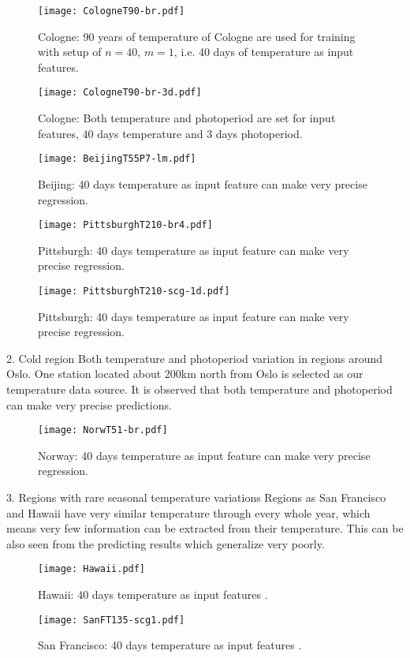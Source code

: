 \documentclass[paper=a4, fontsize=12pt]{scrartcl}	%
\numberwithin{equation}{section}					%
\numberwithin{figure}{section}					%
\numberwithin{table}{section}					%
\begin{document}
\begin{figure}[H]
\centering
\texttt{[image: CologneT90-br.pdf]}
\caption{Cologne: 90 years of temperature of Cologne are used for training with setup of $n=40$, $m=1$, i.e. 40 days of temperature as input features.}
\label{fig:cologneT}
\end{figure}
\begin{figure}[H]
\centering
\texttt{[image: CologneT90-br-3d.pdf]}
\caption{Cologne: Both temperature and photoperiod are set for input features, 40 days temperature and 3 days photoperiod. }
\label{fig:cologneTD}
\end{figure}

\begin{figure}[H]
\centering
\texttt{[image: BeijingT55P7-lm.pdf]}
\caption{Beijing: 40 days temperature as input feature can make very precise regression.}
\label{fig:beijing}
\end{figure}

\begin{figure}[H]
\centering
\texttt{[image: PittsburghT210-br4.pdf]}
\caption{Pittsburgh: 40 days temperature as input feature can make very precise regression.}
\label{fig:pittsT}
\end{figure}

\begin{figure}[H]
\centering
\texttt{[image: PittsburghT210-scg-1d.pdf]}
\caption{Pittsburgh: 40 days temperature as input feature can make very precise regression.}
\label{fig:pittsTD}
\end{figure}

2. Cold region
Both temperature and photoperiod variation in regions around Oslo. One station located about 200km north from Oslo is selected as our temperature data source. It is observed that both temperature and photoperiod can make very precise predictions. 
\begin{figure}[H]
\centering
\texttt{[image: NorwT51-br.pdf]}
\caption{Norway: 40 days temperature as input feature can make very precise regression.}
\label{fig:NorwayT}
\end{figure}

3. Regions with rare seasonal temperature variations
Regions as San Francisco and Hawaii have very similar temperature through every whole year, which means very few information can be extracted from their temperature. This can be also seen from the predicting results which generalize very poorly. 
\begin{figure}[H]
\centering
\texttt{[image: Hawaii.pdf]}
\caption{Hawaii: 40 days temperature as input features .}
\label{fig:HawaiiT}
\end{figure}
\begin{figure}[H]
\centering
\texttt{[image: SanFT135-scg1.pdf]}
\caption{San Francisco: 40 days temperature as input features .}
\label{fig:sanT}
\end{figure}
\end{document}

